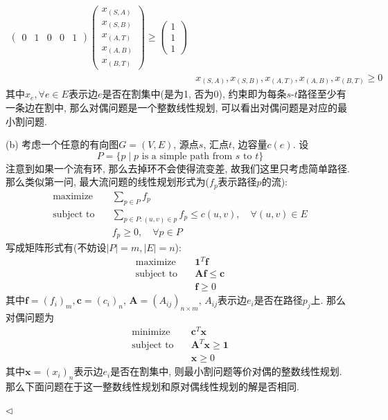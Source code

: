 \documentclass[11pt]{article}
\newenvironment{answer}[1][Answer]{\begin{trivlist}
\item[\hskip \labelsep{\bfseries\itshape#1.}\hskip \labelsep]}{\hfill$\lhd$\end{trivlist}}
\DeclareMathOperator*{\minimize}{minimize}
\DeclareMathOperator*{\maximize}{maximize}
\begin{document}
\begin{answer}
\begin{align*}
\begin{pmatrix}
            0 & 1 & 0 & 0 & 1
        \end{pmatrix} \begin{pmatrix}
            x_{(S,A)} \\
            x_{(S,B)} \\
            x_{(A,T)} \\
            x_{(A,B)} \\
            x_{(B,T)}
        \end{pmatrix} \ge \begin{pmatrix}
            1 \\
            1 \\
            1
        \end{pmatrix} \\
        & x_{(S,A)}, x_{(S,B)}, x_{(A,T)}, x_{(A,B)}, x_{(B,T)} \ge 0
    \end{align*}
    其中$x_e, \forall e \in E$表示边$e$是否在割集中(是为1, 否为0), 约束即为每条$s$-$t$路径至少有一条边在割中, 那么对偶问题是一个整数线性规划, 可以看出对偶问题是对应的最小割问题.

    (b) 考虑一个任意的有向图$G = (V,E)$, 源点$s$, 汇点$t$, 边容量$c(e)$. 设\[P = \{p \mid p \text{ is a simple path from $s$ to $t$}\}\] 注意到如果一个流有环, 那么去掉环不会使得流变差, 故我们这里只考虑简单路径. 那么类似第一问, 最大流问题的线性规划形式为($f_p$表示路径$p$的流):
    \begin{align*}
        \maximize \quad & \sum_{p \in P} f_p \\
        \text{subject to} \quad & \sum_{p \in P: (u,v) \in p} f_p \le c(u,v), \quad \forall (u,v) \in E \\
        & f_p \ge 0, \quad \forall p \in P 
    \end{align*}
    写成矩阵形式有(不妨设$|P| = m, |E| = n$):
    \begin{align*}
        \maximize \quad & \bm{1}^T \bm{f} \\
        \text{subject to} \quad & \bm{A} \bm{f} \le \bm{c} \\
        & \bm{f} \ge 0
    \end{align*}
    其中$\bm{f} = (f_i)_m, \bm{c} = (c_i)_n$, $\bm{A} = (A_{ij})_{n\times m}$, $A_{ij}$表示边$e_i$是否在路径$p_j$上. 那么对偶问题为
    \begin{align*}
        \minimize \quad & \bm{c}^T \bm{x} \\
        \text{subject to} \quad & \bm{A}^T \bm{x} \ge \bm{1} \\
        & \bm{x} \ge 0
    \end{align*}
    其中$\bm{x} = (x_i)_n$表示边$e_i$是否在割集中, 则最小割问题等价对偶的整数线性规划. 那么下面问题在于这一整数线性规划和原对偶线性规划的解是否相同.
    

\end{answer}
\end{document}
